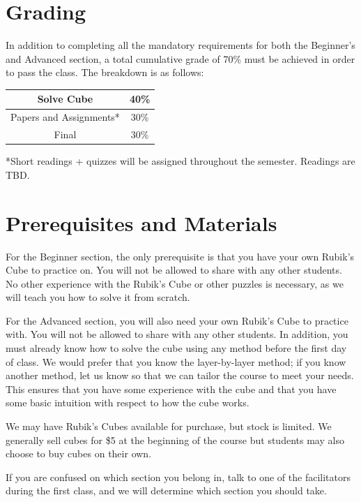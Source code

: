 \documentclass[11pt]{article}
\begin{document}
\section*{Grading}
In addition to completing all the mandatory requirements for both the Beginner’s and Advanced section, a total cumulative grade of 70\% must be achieved in order to pass the class.  The breakdown is as follows:

\begin{center}
	\begin{tabular}{|| c | c ||}
	\hline
	Solve Cube & 40\% \\
	\hline
	Papers and Assignments* & 30\% \\
	\hline
	Final & 30\% \\
	\hline
	\end{tabular}
\end{center}

*Short readings + quizzes will be assigned throughout the semester. Readings are TBD. 


\section*{Prerequisites and Materials}
For the Beginner section, the only prerequisite is that you have your own Rubik’s Cube to practice on. You will not be allowed to share with any other students. No other experience with the Rubik’s Cube or other puzzles is necessary, as we will teach you how to solve it from scratch.

For the Advanced section, you will also need your own Rubik’s Cube to practice with. You will not be allowed to share with any other students. In addition, you must already know how to solve the cube using any method before the first day of class. We would prefer that you know the layer-by-layer method; if you know another method, let us know so that we can tailor the course to meet your needs. This ensures that you have some experience with the cube and that you have some basic intuition with respect to how the cube works.

We may have Rubik’s Cubes available for purchase, but stock is limited. We generally sell cubes for \$5 at the beginning of the course but students may also choose to buy cubes on their own.

If you are confused on which section you belong in, talk to one of the facilitators during the first class, and we will determine which section you should take.
\end{document}

